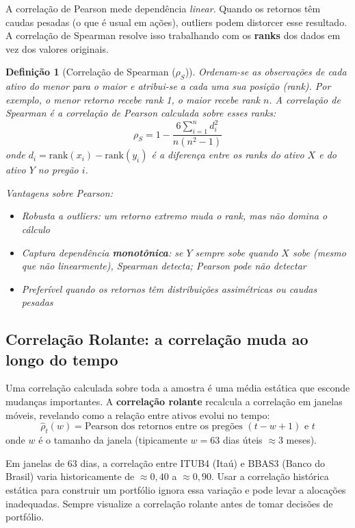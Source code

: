 \documentclass[11pt,a4paper]{article}
\theoremstyle{quant}
\newtheorem{definicao}{Definição}[section]
\begin{document}
A correlação de Pearson mede dependência \emph{linear}. Quando os retornos têm
caudas pesadas (o que é usual em ações), outliers podem distorcer esse resultado.
A correlação de Spearman resolve isso trabalhando com os \textbf{ranks} dos dados
em vez dos valores originais.

\begin{definicao}[Correlação de Spearman ($\rho_S$)]
Ordenam-se as observações de cada ativo do menor para o maior e atribui-se a cada
uma sua posição (rank). Por exemplo, o menor retorno recebe rank 1, o maior recebe
rank $n$. A correlação de Spearman é a correlação de Pearson calculada sobre esses ranks:
\[
  \rho_S = 1 - \frac{6\displaystyle\sum_{i=1}^{n} d_i^2}{n(n^2-1)}
\]
onde $d_i = \mathrm{rank}(x_i) - \mathrm{rank}(y_i)$ é a diferença entre os ranks
do ativo $X$ e do ativo $Y$ no pregão $i$.

Vantagens sobre Pearson:
\begin{itemize}
  \item Robusta a outliers: um retorno extremo muda o rank, mas não domina o cálculo
  \item Captura dependência \textbf{monotônica}: se $Y$ sempre sobe quando $X$ sobe
        (mesmo que não linearmente), Spearman detecta; Pearson pode não detectar
  \item Preferível quando os retornos têm distribuições assimétricas ou caudas pesadas
\end{itemize}
\end{definicao}

\subsection{Correlação Rolante: a correlação muda ao longo do tempo}

Uma correlação calculada sobre toda a amostra é uma média estática que esconde
mudanças importantes. A \textbf{correlação rolante} recalcula a correlação em
janelas móveis, revelando como a relação entre ativos evolui no tempo:
\[
  \hat\rho_t(w) = \text{Pearson dos retornos entre os pregões } (t - w + 1) \text{ e } t
\]
onde $w$ é o tamanho da janela (tipicamente $w = 63$ dias úteis $\approx 3$ meses).

\begin{caixainsight}
Em janelas de 63 dias, a correlação entre ITUB4 (Itaú) e BBAS3 (Banco do Brasil)
varia historicamente de $\approx 0{,}40$ a $\approx 0{,}90$. Usar a correlação
histórica estática para construir um portfólio ignora essa variação e pode levar
a alocações inadequadas. Sempre visualize a correlação rolante antes de tomar
decisões de portfólio.
\end{caixainsight}
\end{document}
